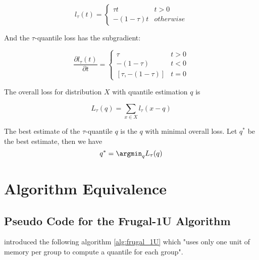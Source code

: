 \begin{equation}
    l_\tau(t)= 
        \begin{cases}
            \tau t & t > 0\\
            -(1-\tau) t & otherwise
        \end{cases}
\end{equation}


And the $\tau$-quantile loss has the {\color{red} subgradient}:

\begin{equation}
    \frac {\partial l_\tau(t)}{\partial t}= 
        \begin{cases}
            \tau                & t > 0\\
            -(1-\tau)           & t < 0\\
            [\tau, -(1 - \tau)] & t = 0
        \end{cases}
\end{equation}



The overall loss for distribution $X$ with quantile estimation $q$ is

\begin{equation}
    L_{\tau}(q) = \sum_{x \in X} l_{\tau}(x - q)
\end{equation}


The best estimate of the $\tau$-quantile $q$ is the $q$ with minimal overall loss. 
Let $q^\ast$ be the best estimate, then we have
\begin{equation}
    q^\ast = \argmin_{q} L_{\tau}(q)
\end{equation}



\section{Algorithm Equivalence}

\subsection{Pseudo Code for the Frugal-1U Algorithm}

\citeauthor{maFrugalStreamingEstimating2014}\cite{maFrugalStreamingEstimating2014}
introduced the following algorithm \ref{alg:frugal_1U} which 
"uses only one unit of memory per group to compute a quantile for each group"\cite{maFrugalStreamingEstimating2014}.

